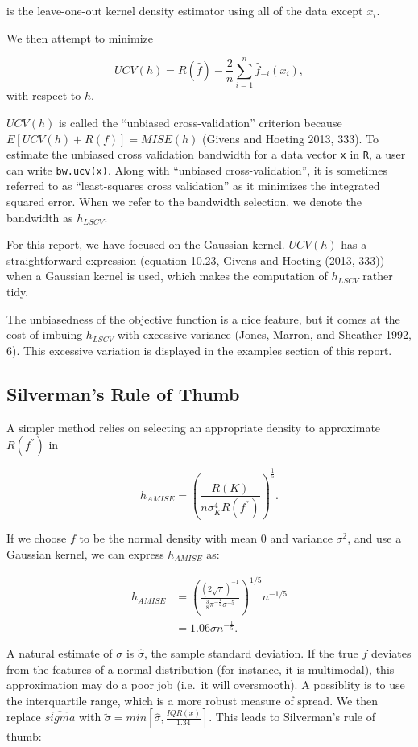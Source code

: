 \documentclass[]{article}
\begin{document}
is the leave-one-out kernel density estimator using all of the data
except \(x_i\).

We then attempt to minimize

\[
UCV(h) = R(\hat{f}) - \frac{2}{n} \sum_{i = 1}^{n} \hat{f}_{-i}(x_i),
\] with respect to \(h\).

\(UCV(h)\) is called the ``unbiased cross-validation'' criterion because
\(E\left[UCV(h) + R(f)\right] = MISE(h)\) (Givens and Hoeting 2013,
333). To estimate the unbiased cross validation bandwidth for a data
vector \texttt{x} in \texttt{R}, a user can write \texttt{bw.ucv(x)}.
Along with ``unbiased cross-validation'', it is sometimes referred to as
``least-squares cross validation'' as it minimizes the integrated
squared error. When we refer to the bandwidth selection, we denote the
bandwidth as \(h_{LSCV}\).

For this report, we have focused on the Gaussian kernel. \(UCV(h)\) has
a straightforward expression (equation 10.23, Givens and Hoeting (2013,
333)) when a Gaussian kernel is used, which makes the computation of
\(h_{LSCV}\) rather tidy.

The unbiasedness of the objective function is a nice feature, but it
comes at the cost of imbuing \(h_{LSCV}\) with excessive variance
(Jones, Marron, and Sheather 1992, 6). This excessive variation is
displayed in the examples section of this report.

\subsection{Silverman's Rule of Thumb}\label{silvermans-rule-of-thumb}

A simpler method relies on selecting an appropriate density to
approximate \(R(f^{''})\) in

\[
h_{AMISE} = \left(\frac{R(K)}{n\sigma_K^4R(f^{''})}\right)^{\frac{1}{5}}.
\]

If we choose \(f\) to be the normal density with mean 0 and variance
\(\sigma^2\), and use a Gaussian kernel, we can express \(h_{AMISE}\)
as:

\[
\begin{aligned}
h_{AMISE} &= \left(\frac{(2\sqrt{\pi})^{-1}}{\frac{3}{8}\pi^{-\frac{1}{2}}\sigma^{-5}}\right)^{1/5} n^{-1/5} \\
&= 1.06\sigma n^{-\frac{1}{5}}.
\end{aligned}
\]

A natural estimate of \(\sigma\) is \(\hat{\sigma}\), the sample
standard deviation. If the true \(f\) deviates from the features of a
normal distribution (for instance, it is multimodal), this approximation
may do a poor job (i.e.~it will oversmooth). A possiblity is to use the
interquartile range, which is a more robust measure of spread. We then
replace \(\hat{sigma}\) with
\(\tilde{\sigma} = min\left[\hat{\sigma}, \frac{IQR(x)}{1.34}\right]\).
This leads to Silverman's rule of thumb:
\end{document}
